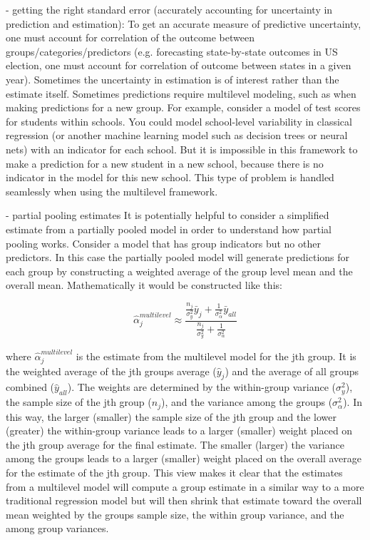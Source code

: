 - getting the right standard error (accurately accounting for uncertainty in prediction and estimation): To get an accurate measure of predictive uncertainty, one must account for correlation of the outcome between groups/categories/predictors (e.g. forecasting state-by-state outcomes in US election, one must account for correlation of outcome between states in a given year). Sometimes the uncertainty in estimation is of interest rather than the estimate itself. Sometimes predictions require multilevel modeling, such as when making predictions for a new group. For example, consider a model of test scores for students within schools. You could model school-level variability in classical regression (or another machine learning model such as decision trees or neural nets) with an indicator for each school. But it is impossible in this framework to make a prediction for a new student in a new school, because there is no indicator in the model for this new school. This type of problem is handled seamlessly when using the multilevel framework.

- partial pooling estimates
It is potentially helpful to consider a simplified estimate from a partially pooled model in order to understand how partial pooling works. Consider a model that has group indicators but no other predictors. In this case the partially pooled model will generate predictions for each group by constructing a weighted average of the group level mean and the overall mean. Mathematically it would be constructed like this:

\begin{equation}
\hat{\alpha}_j^{multilevel} \approx \frac{ \frac{n_j}{\sigma_y^2} \bar{y}_j + \frac{1}{\sigma_{\alpha}^2} \bar{y}_{all} }{ \frac{n_j}{\sigma_y^2} + \frac{1}{\sigma_{\alpha}^2} }
\end{equation}

where $\hat{\alpha}_j^{multilevel}$ is the estimate from the multilevel model for the jth group. It is the weighted average of the jth groups average ($\hat{y}_j$) and the average of all groups combined ($\hat{y}_{all}$). The weights are determined by the within-group variance ($\sigma_y^2$), the sample size of the jth group ($n_j$), and the variance among the groups ($\sigma_{\alpha}^2$). In this way, the larger (smaller) the sample size of the jth group and the lower (greater) the within-group variance leads to a larger (smaller) weight placed on the jth group average for the final estimate. The smaller (larger) the variance among the groups leads to a larger (smaller) weight placed on the overall average for the estimate of the jth group. This view makes it clear that the estimates from a multilevel model will compute a group estimate in a similar way to a more traditional regression model but will then shrink that estimate toward the overall mean weighted by the groups sample size, the within group variance, and the among group variances.

